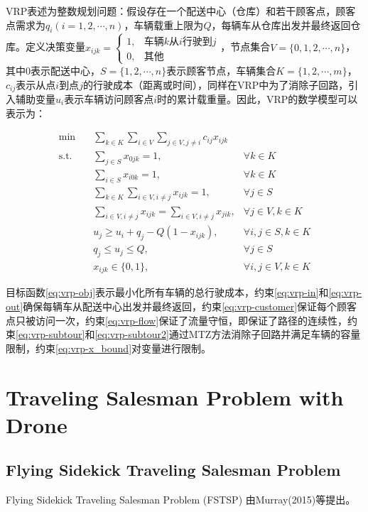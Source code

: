 VRP表述为整数规划问题\cite{2014Vehicle}：假设存在一个配送中心（仓库）和若干顾客点，顾客点需求为$q_i(i = 1,2,\cdots,n)$，车辆载重上限为$Q$，每辆车从仓库出发并最终返回仓库。定义决策变量$x_{ijk} = \begin{cases}1, & \text{车辆$k$从$i$行驶到$j$}\\0, & \text{其他} \end{cases}$，节点集合$V = \{0, 1, 2, \cdots, n\}$，其中0表示配送中心，$S = \{1,2,\cdots,n\}$表示顾客节点，车辆集合$K = \{1,2,\cdots,m\}$，$c_{ij}$表示从点$i$到点$j$的行驶成本（距离或时间），同样在VRP中为了消除子回路，引入辅助变量$u_i$表示车辆访问顾客点$i$时的累计载重量。因此，VRP的数学模型可以表示为：

\begin{align}
    \min \quad & \sum_{k \in K}\sum_{i \in V}\sum_{j \in V, j \neq i} c_{ij}x_{ijk} & \label{eq:vrp-obj}\\
    \text{s.t.} \quad & \sum_{j \in S} x_{0jk} = 1, & \forall k \in K\label{eq:vrp-in}\\
    \quad & \sum_{i \in S} x_{i0k} = 1, & \forall k \in K\label{eq:vrp-out}\\
    \quad & \sum_{k \in K}\sum_{i \in V, i \neq j} x_{ijk} = 1, & \forall j \in S\label{eq:vrp-customer}\\
    \quad & \sum_{i \in V, i \neq j}x_{ijk} = \sum_{i \in V, i \neq j} x_{jik}, & \forall j \in V, k \in K\label{eq:vrp-flow}\\
    \quad & u_j \geq u_i + q_j -Q(1 - x_{ijk}), & \forall i, j \in S, k \in K\label{eq:vrp-subtour}\\
    \quad & q_j \leq u_j \leq Q, & \forall j \in S\label{eq:vrp-subtour2}\\
    \quad & x_{ijk} \in \{0, 1\}, & \forall i, j \in V, k \in K\label{eq:vrp-x_bound}
\end{align}

目标函数\ref{eq:vrp-obj}表示最小化所有车辆的总行驶成本，约束\ref{eq:vrp-in}和\ref{eq:vrp-out}确保每辆车从配送中心出发并最终返回，约束\ref{eq:vrp-customer}保证每个顾客点只被访问一次，约束\ref{eq:vrp-flow}保证了流量守恒，即保证了路径的连续性，约束\ref{eq:vrp-subtour}和\ref{eq:vrp-subtour2}通过MTZ方法消除子回路并满足车辆的容量限制，约束\ref{eq:vrp-x_bound}对变量进行限制。

\chapter{Traveling Salesman Problem with Drone}

\section{Flying Sidekick Traveling Salesman Problem}
Flying Sidekick Traveling Salesman Problem (FSTSP) 由Murray(2015)等\cite{murrayFlyingSidekickTraveling2015}提出。

